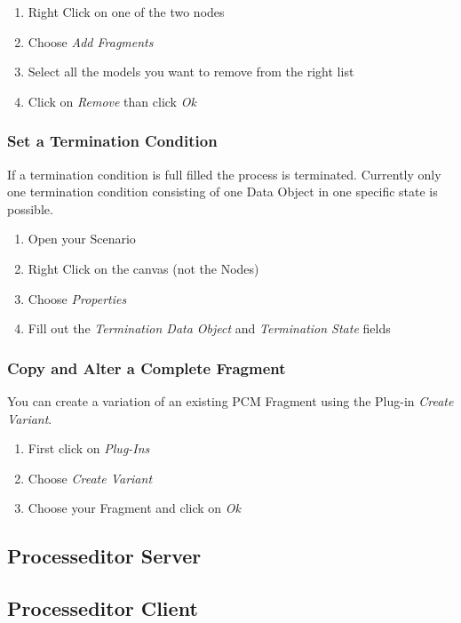 \documentclass{acm_proc_article-sp}
\begin{document}
\begin{enumerate}
\def\labelenumi{\arabic{enumi}.}
\itemsep1pt\parskip0pt
\item
  Right Click on one of the two nodes
\item
  Choose \emph{Add Fragments}
\item
  Select all the models you want to remove from the right list
\item
  Click on \emph{Remove} than click \emph{Ok}
\end{enumerate}

\subsubsection{Set a Termination
Condition}\label{set-a-termination-condition}

If a termination condition is full filled the process is terminated.
Currently only one termination condition consisting of one Data Object
in one specific state is possible.

\begin{enumerate}
\def\labelenumi{\arabic{enumi}.}
\itemsep1pt\parskip0pt
\item
  Open your Scenario
\item
  Right Click on the canvas (not the Nodes)
\item
  Choose \emph{Properties}
\item
  Fill out the \emph{Termination Data Object} and \emph{Termination
  State} fields
\end{enumerate}

\subsubsection{Copy and Alter a Complete
Fragment}\label{copy-and-alter-a-complete-fragment}

You can create a variation of an existing PCM Fragment using the Plug-in
\emph{Create Variant}.

\begin{enumerate}
\def\labelenumi{\arabic{enumi}.}
\itemsep1pt\parskip0pt
\item
  First click on \emph{Plug-Ins}
\item
  Choose \emph{Create Variant}
\item
  Choose your Fragment and click on \emph{Ok}
\end{enumerate}


%
%
\subsection{Processeditor Server}


%
%
\subsection{Processeditor Client}


%
%

%
 

%
%
\end{document}
